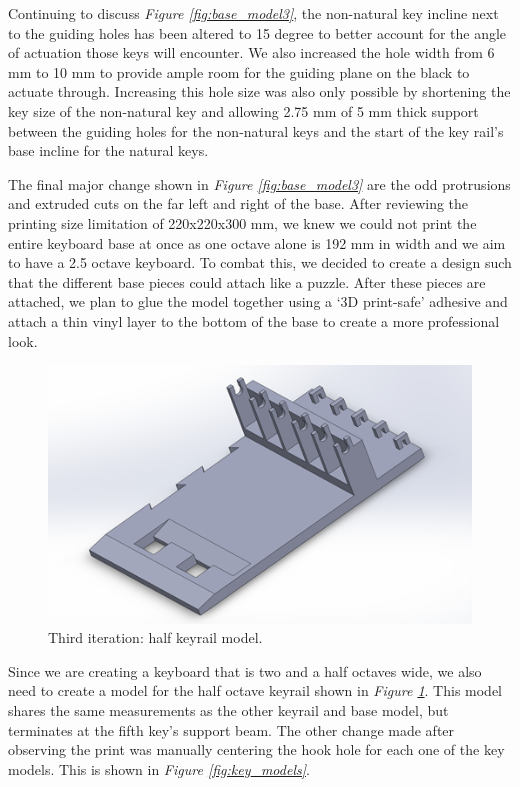 Continuing to discuss \textit{Figure \ref{fig:base_model3}}, the non-natural key incline next to the guiding holes has been altered to 15 degree to better account for the angle of actuation those keys will encounter. We also increased the hole width from 6 mm to 10 mm to provide ample room for the guiding plane on the black to actuate through. Increasing this hole size was also only possible by shortening the key size of the non-natural key and allowing 2.75 mm of 5 mm thick support between the guiding holes for the non-natural keys and the start of the key rail’s base incline for the natural keys.

The final major change shown in \textit{Figure \ref{fig:base_model3}} are the odd protrusions and extruded cuts on the far left and right of the base. After reviewing the printing size limitation of 220x220x300 mm, we knew we could not print the entire keyboard base at once as one octave alone is 192 mm in width and we aim to have a 2.5 octave keyboard. To combat this, we decided to create a design such that the different base pieces could attach like a puzzle. After these pieces are attached, we plan to glue the model together using a ‘3D print-safe’ adhesive and attach a thin vinyl layer to the bottom of the base to create a more professional look.

\begin{figure}[h!]
  \centering
  \includegraphics[width=0.8\linewidth]{image/BaseModel4.png}
  \caption{Third iteration: half keyrail model.}
  \label{fig:base_model4}
\end{figure}

Since we are creating a keyboard that is two and a half octaves wide, we also need to create a model for the half octave keyrail shown in \textit{Figure \ref{fig:base_model4}}. This model shares the same measurements as the other keyrail and base model, but terminates at the fifth key’s support beam.
The other change made after observing the print was manually centering the hook hole for each one of the key models. This is shown in \textit{Figure \ref{fig:key_models}}.

